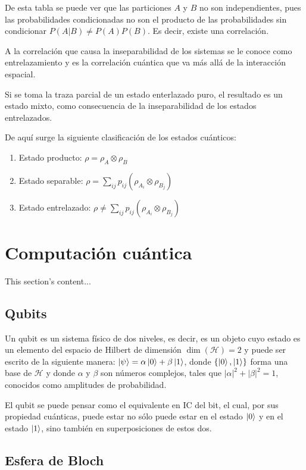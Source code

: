 De esta tabla se puede ver que las particiones $A$ y $B$ no son independientes, pues las probabilidades condicionadas no son el producto de las probabilidades sin condicionar $P(A|B) \neq P(A)P(B)$. Es decir, existe una correlación.

A la correlación que causa la inseparabilidad de los sistemas se le conoce como entrelazamiento y es la correlación cuántica que va más allá de la interacción espacial.

Si se toma la traza parcial de un estado enterlazado puro, el resultado es un estado mixto, como consecuencia de la inseparabilidad de los estados entrelazados.

De aquí surge la siguiente clasificación de los estados cuánticos:

\begin{enumerate}
    \item Estado producto: $\rho = \rho_A \otimes \rho_B$
    \item Estado separable: $\rho = \sum\limits_{i j} p_{i j} (\rho_{A_i} \otimes \rho_{B_j})$
    \item Estado entrelazado: $\rho \neq \sum\limits_{i j} p_{i j} (\rho_{A_i} \otimes \rho_{B_j})$
\end{enumerate}


\section{Computación cuántica}
This section's content...

\subsection{Qubits}
Un qubit es un sistema físico de dos niveles, es decir, es un objeto cuyo estado es un elemento del espacio de Hilbert de dimensión $\dim (\mathcal{H})=2$ y puede ser escrito de la siguiente manera: $ \ket{\psi} = \alpha \ket{0} + \beta \ket{1} $, donde $ \{ \ket{0},\ket{1} \} $ forma una base de $\mathcal{H}$ y donde $ \alpha $ y $ \beta $ son números complejos, tales que $ | \alpha |^2 + | \beta |^2 = 1 $, conocidos como amplitudes de probabilidad.

El qubit se puede pensar como el equivalente en IC del bit, el cual, por sus propiedad cuánticas, puede estar no sólo puede estar en el estado $\ket{0}$ y en el estado $\ket{1}$, sino también en superposiciones de estos dos.

\subsection{Esfera de Bloch}

